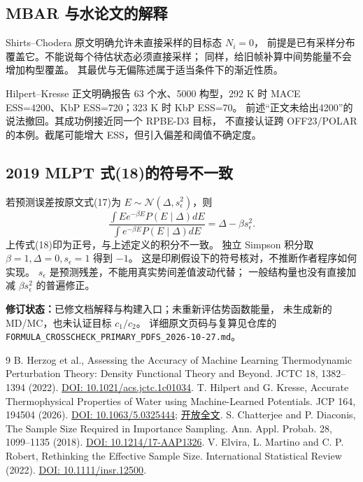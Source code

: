 \documentclass[11pt,a4paper]{article}
\begin{document}
\subsection{MBAR 与水论文的解释}
Shirts--Chodera 原文明确允许未直接采样的目标态 $N_i=0$，
前提是已有采样分布覆盖它。不能说每个待估状态必须直接采样；
同样，给旧帧补算中间势能量不会增加构型覆盖。
其最优与无偏陈述属于适当条件下的渐近性质。

Hilpert--Kresse 正文明确报告 63 个水、5000 构型，292 K 时
MACE ESS=4200、KbP ESS=720；323 K 时 KbP ESS=70。
前述“正文未给出4200”的说法撤回。其成功例接近同一个 RPBE-D3 目标，
不直接认证跨 OFF23/POLAR 的本例。截尾可能增大 ESS，但引入偏差和阈值不确定度。

\subsection{2019 MLPT 式(18)的符号不一致}
若预测误差按原文式(17)为 $E\sim\mathcal N(\Delta,s_\epsilon^2)$，则
\begin{equation}
\frac{\int E e^{-\beta E}P(E\mid\Delta)dE}
{\int e^{-\beta E}P(E\mid\Delta)dE}=\Delta-\beta s_\epsilon^2.
\end{equation}
上传式(18)印为正号，与上述定义的积分不一致。
独立 Simpson 积分取 $\beta=1,\Delta=0,s_\epsilon=1$ 得到 $-1$。
这是印刷假设下的符号核对，不推断作者程序如何实现。
$s_\epsilon$ 是预测残差，不能用真实势间差值波动代替；
一般结构量也没有直接加减 $\beta s_\epsilon^2$ 的普遍修正。

\textbf{修订状态：}已修文档解释与构建入口；未重新评估势函数能量，
未生成新的 MD/MC，也未认证目标 $c_1/c_2$。
详细原文页码与复算见仓库的
\texttt{FORMULA\_CROSSCHECK\_PRIMARY\_PDFS\_2026-10-27.md}。

\newpage
\begin{thebibliography}{9}
 B. Herzog et al., Assessing the Accuracy of Machine Learning Thermodynamic Perturbation Theory: Density Functional Theory and Beyond. JCTC 18, 1382--1394 (2022). \href{https://doi.org/10.1021/acs.jctc.1c01034}{DOI: 10.1021/acs.jctc.1c01034}.
 T. Hilpert and G. Kresse, Accurate Thermophysical Properties of Water using Machine-Learned Potentials. JCP 164, 194504 (2026). \href{https://doi.org/10.1063/5.0325444}{DOI: 10.1063/5.0325444}; \href{https://arxiv.org/html/2601.21103v1}{开放全文}.
 S. Chatterjee and P. Diaconis, The Sample Size Required in Importance Sampling. Ann. Appl. Probab. 28, 1099--1135 (2018). \href{https://doi.org/10.1214/17-AAP1326}{DOI: 10.1214/17-AAP1326}.
 V. Elvira, L. Martino and C. P. Robert, Rethinking the Effective Sample Size. International Statistical Review (2022). \href{https://doi.org/10.1111/insr.12500}{DOI: 10.1111/insr.12500}.
\end{thebibliography}
\end{document}
